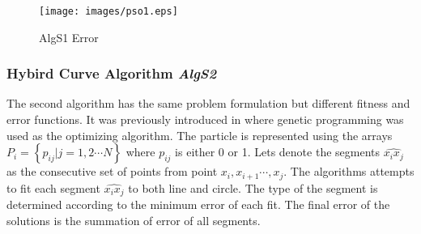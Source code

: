 \begin{figure}
	\centering
  \texttt{[image: images/pso1.eps]}			
	\caption{AlgS1 Error}%
	\label{fig:DPSOERROR}
\end{figure}
\subsubsection{Hybird Curve Algorithm \textsl{AlgS2}}
\label{sec:PolygonDivisionAlgorithm}

The second algorithm has the same problem formulation but different fitness and error functions. It was previously introduced in  \cite{CruveDivisionSwarm} where genetic programming was used as the optimizing algorithm. The particle is represented using the arrays $P_i = \left\{ {p_{ij} \left| {j = 1,2 \cdots N} \right.} \right\}$ where $p_{ij}$ is either 0 or 1. Lets denote the segments $\widehat{x_ix_j}$ as the consecutive set of points from point $x_i,x_{i+1} \cdots,x_j$. The algorithms attempts to fit each segment $\widehat{x_ix_j}$ to both line and circle. The type of the segment is determined according to the minimum error of each fit. The final error of the solutions is the summation of error of all segments.  %
